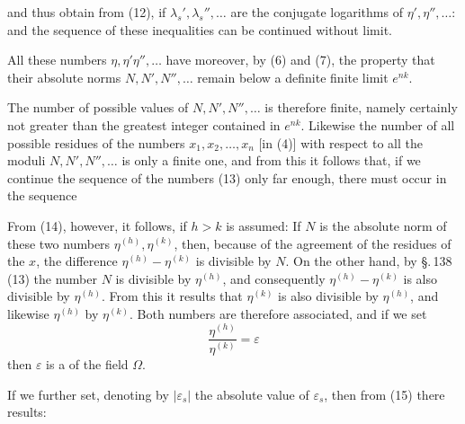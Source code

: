 and thus obtain from (12), if $\lambda_s', \lambda_s'', \dots$ are the conjugate logarithms of $\eta', \eta'', \dots$:
and the sequence of these inequalities can be continued without limit.

All these numbers $\eta, \eta' \eta'', \dots$ have moreover, by (6) and (7), the property that their absolute norms $N, N', N'', \dots$ remain below a definite finite limit $e^{nk}$.


The number of possible values of $N, N', N'', \dots$ is therefore finite, namely certainly not greater than the greatest integer contained in $e^{nk}$. Likewise the number of all possible residues of the numbers $x_1, x_2, \dots, x_n$ [in (4)] with respect to all the moduli $N, N', N'', \dots$ is only a finite one, and from this it follows that, if we continue the sequence of the numbers (13) only far enough, there must occur in the sequence 

From (14), however, it follows, if $h > k$ is assumed:
If $N$ is the absolute norm of these two numbers $\eta^{(h)}, \eta^{(k)}$, then, because of the agreement of the residues of the $x$, the difference $\eta^{(h)} - \eta^{(k)}$ is divisible by $N$. On the other hand, by \S.\,138\,(13) the number $N$ is divisible by $\eta^{(h)}$, and consequently $\eta^{(h)} - \eta^{(k)}$ is also divisible by $\eta^{(h)}$. From this it results that $\eta^{(k)}$ is also divisible by $\eta^{(h)}$, and likewise $\eta^{(h)}$ by $\eta^{(k)}$. Both numbers are therefore associated, and if we set
\[
\frac{\eta^{(h)}}{\eta^{(k)}} = \varepsilon
\]
then $\varepsilon$ is a  of the field $\Omega$.

If we further set, denoting by $|\varepsilon_s|$ the absolute value of $\varepsilon_s$,
then from (15) there results:
